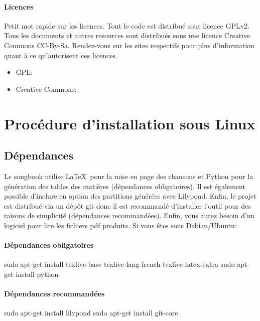 \documentclass[versionenligne]{patacrep}
\begin{document}
\paragraph{Licences}
Petit mot rapide sur les licences. Tout le code est distribué sous
licence GPLv2. Tous les documents et autres resources sont distribués
sous une licence Creative Commons CC-By-Sa. Rendez-vous sur les sites
respectifs pour plus d'information quant à ce qu'autorisent ces
licences.

\begin{itemize}
\item GPL: \url{}
\item Creative Commons: \url{}
\end{itemize}


\section{Procédure d'installation sous Linux}

\subsection{Dépendances}
\label{sec:songbook-dep}

Le songbook utilise \LaTeX\, pour la mise en page des chansons et Python
pour la génération des tables des matières (dépendances obligatoires).
Il est également possible d'inclure en option des partitions générées
avec Lilypond. Enfin, le projet est distribué via un dépôt git donc il
est recommandé d'installer l'outil pour des raisons de simplicité
(dépendances recommandées). Enfin, vous aurez besoin d'un logiciel
pour lire les fichiers pdf produits. Si vous êtes sous Debian/Ubuntu:

\paragraph{Dépendances obligatoires}
\begin{unixcom}
  sudo apt-get install texlive-base texlive-lang-french texlive-latex-extra
  sudo apt-get install python
\end{unixcom}

\paragraph{Dépendances recommandées}
\begin{unixcom}
  sudo apt-get install lilypond
  sudo apt-get install git-core
\end{unixcom}
\end{document}
